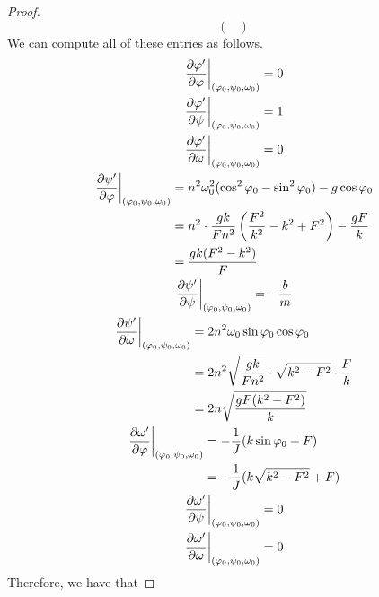 \documentclass[../psets.tex]{subfiles}
\begin{document}
\begin{enumerate}
\begin{enumerate}
\begin{proof}
\begin{equation*}
\begin{pmatrix}
                \end{pmatrix}
            \end{equation*}
            We can compute all of these entries as follows.
            \begingroup
            \allowdisplaybreaks
            \begin{gather*}
                \eval{\pdv{\varphi'}{\varphi}}_{(\varphi_0,\psi_0,\omega_0)} = 0\\
                \eval{\pdv{\varphi'}{\psi}}_{(\varphi_0,\psi_0,\omega_0)} = 1\\
                \eval{\pdv{\varphi'}{\omega}}_{(\varphi_0,\psi_0,\omega_0)} = 0\\
                \begin{split}
                    \eval{\pdv{\psi'}{\varphi}}_{(\varphi_0,\psi_0,\omega_0)} &= n^2\omega_0^2(\cos^2\varphi_0-\sin^2\varphi_0)-g\cos\varphi_0\\
                    &= n^2\cdot\frac{gk}{Fn^2}\left( \frac{F^2}{k^2}-k^2+F^2 \right)-\frac{gF}{k}\\
                    &= \frac{gk(F^2-k^2)}{F}
                \end{split}\\
                \eval{\pdv{\psi'}{\psi}}_{(\varphi_0,\psi_0,\omega_0)} = -\frac{b}{m}\\
                \begin{split}
                    \eval{\pdv{\psi'}{\omega}}_{(\varphi_0,\psi_0,\omega_0)} &= 2n^2\omega_0\sin\varphi_0\cos\varphi_0\\
                    &= 2n^2\sqrt{\frac{gk}{Fn^2}}\cdot\sqrt{k^2-F^2}\cdot\frac{F}{k}\\
                    &= 2n\sqrt{\frac{gF(k^2-F^2)}{k}}
                \end{split}\\
                \begin{split}
                    \eval{\pdv{\omega'}{\varphi}}_{(\varphi_0,\psi_0,\omega_0)} &= -\frac{1}{J}(k\sin\varphi_0+F)\\
                    &= -\frac{1}{J}(k\sqrt{k^2-F^2}+F)
                \end{split}\\
                \eval{\pdv{\omega'}{\psi}}_{(\varphi_0,\psi_0,\omega_0)} = 0\\
                \eval{\pdv{\omega'}{\omega}}_{(\varphi_0,\psi_0,\omega_0)} = 0
            \end{gather*}
            \endgroup
            Therefore, we have that

\end{proof}
\end{enumerate}
\end{enumerate}
\end{document}
